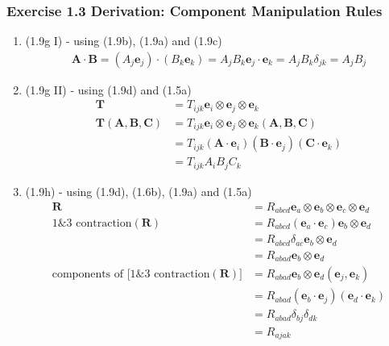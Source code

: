 \documentclass[10pt,a4paper]{article}
\theoremstyle{definition}
\begin{document}
\subsubsection{Exercise 1.3 Derivation: Component Manipulation Rules}
\begin{enumerate}
\item (1.9g I) - using (1.9b), (1.9a) and (1.9c)
\begin{align}
    \mathbf{A}\cdot\mathbf{B}
    =(A_j\mathbf{e}_j)\cdot(B_k\mathbf{e}_k)
    =A_jB_k\mathbf{e}_j\cdot\mathbf{e}_k
    =A_jB_k\delta_{jk}
    =A_jB_j
\end{align}
\item (1.9g II) - using (1.9d) and (1.5a)
\begin{align}
    \mathbf{T}&=T_{ijk}\mathbf{e}_i\otimes\mathbf{e}_j\otimes\mathbf{e}_k\\
    \mathbf{T}(\mathbf{A},\mathbf{B},\mathbf{C})
    &=T_{ijk}\mathbf{e}_i\otimes\mathbf{e}_j\otimes\mathbf{e}_k(\mathbf{A},\mathbf{B},\mathbf{C})\\
    &=T_{ijk}(\mathbf{A}\cdot\mathbf{e}_i)(\mathbf{B}\cdot\mathbf{e}_j)(\mathbf{C}\cdot\mathbf{e}_k)\\
    &=T_{ijk}A_iB_jC_k
\end{align}
\item (1.9h) - using (1.9d), (1.6b), (1.9a) and (1.5a)
\begin{align}
    \mathbf{R}
    &=R_{abcd}\mathbf{e}_a\otimes\mathbf{e}_b\otimes\mathbf{e}_c\otimes\mathbf{e}_d\\
    \text{1\&3 contraction}(\mathbf{R})
    &=R_{abcd}(\mathbf{e}_a\cdot\mathbf{e}_c) \mathbf{e}_b\otimes\mathbf{e}_d\\
    &=R_{abcd}\delta_{ac} \mathbf{e}_b\otimes\mathbf{e}_d\\
    &=R_{abad}\mathbf{e}_b\otimes\mathbf{e}_d\\
    \text{components of [1\&3 contraction}(\mathbf{R})]&=R_{abad}\mathbf{e}_b\otimes\mathbf{e}_d(\mathbf{e}_j,\mathbf{e}_k)\\
    &=R_{abad}(\mathbf{e}_b\cdot\mathbf{e}_j)(\mathbf{e}_d\cdot\mathbf{e}_k)\\
    &=R_{abad}\delta_{bj}\delta_{dk}\\
    &=R_{ajak}
\end{align}
\end{enumerate}
\end{document}
